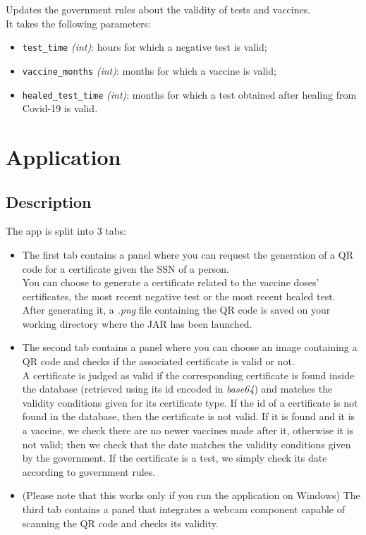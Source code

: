\documentclass[12pt, a4paper]{article}
\begin{document}
\noindent
Updates the government rules about the validity of tests and vaccines. \\
It takes the following parameters:
\begin{itemize}
    \item \texttt{test\_time} \emph{(int)}: hours for which a negative test is valid;
    \item \texttt{vaccine\_months} \emph{(int)}: months for which a vaccine is valid;
    \item \texttt{healed\_test\_time} \emph{(int)}: months for which a test obtained after 
        healing from Covid-19 is valid.
 \end{itemize}

\clearpage

\section{Application}

\subsection{Description}

The app is split into 3 tabs: 
\begin{itemize}
    \item The first tab contains a panel where you can request the generation of a
        QR code for a certificate given the SSN of a person. \\ 
        You can choose to generate a certificate related to the vaccine doses' 
        certificates, the most recent negative test or the most recent healed test. \\ 
        After generating it, a \emph{.png} file containing the QR code is saved on your 
        working directory where the JAR has been launched. 
    \item The second tab contains a panel where you can choose an image containing a QR 
        code and checks if the associated certificate is valid or not. \\
        A certificate is judged as valid if the corresponding certificate is found inside
        the database (retrieved using its id encoded in \emph{base64}) and matches the 
        validity conditions given for its certificate type. 
If the id of a certificate is not found in the database, then the certificate is not valid.
If it is found and it is a vaccine, we check there are no newer vaccines made after it, otherwise it is not valid; then we check that the date matches the validity conditions given by the government. If the certificate is a test, we simply check its date according to government rules.
    \item (Please note that this works only if you run the application on Windows) The 
        third tab contains a panel that integrates a webcam component capable of 
        scanning the QR code and checks its validity.
\end{itemize}
\end{document}
